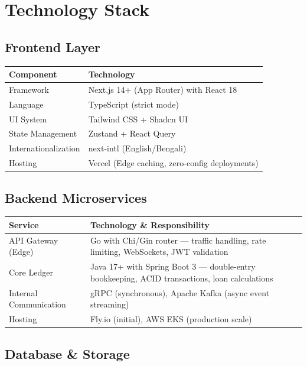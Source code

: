 \documentclass[11pt,a4paper]{article}
\begin{document}
\section{Technology Stack}

\subsection{Frontend Layer}

\begin{tabular}{@{}p{4cm}p{9cm}@{}}
\toprule
\textbf{Component} & \textbf{Technology} \\
\midrule
Framework & Next.js 14+ (App Router) with React 18 \\
Language & TypeScript (strict mode) \\
UI System & Tailwind CSS + Shadcn UI \\
State Management & Zustand + React Query \\
Internationalization & next-intl (English/Bengali) \\
Hosting & Vercel (Edge caching, zero-config deployments) \\
\bottomrule
\end{tabular}

\subsection{Backend Microservices}

\begin{tabular}{@{}p{4cm}p{9cm}@{}}
\toprule
\textbf{Service} & \textbf{Technology \& Responsibility} \\
\midrule
API Gateway (Edge) & Go with Chi/Gin router --- traffic handling, rate limiting, WebSockets, JWT validation \\
\addlinespace
Core Ledger & Java 17+ with Spring Boot 3 --- double-entry bookkeeping, ACID transactions, loan calculations \\
\addlinespace
Internal Communication & gRPC (synchronous), Apache Kafka (async event streaming) \\
\addlinespace
Hosting & Fly.io (initial), AWS EKS (production scale) \\
\bottomrule
\end{tabular}

\subsection{Database \& Storage}
\end{document}
